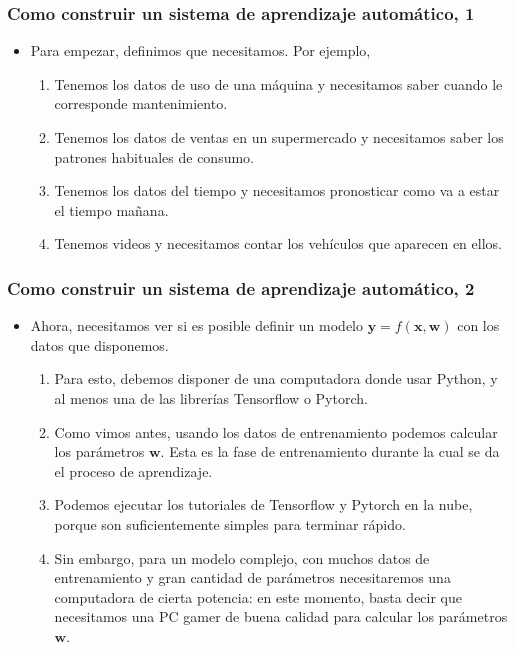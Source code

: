 \documentclass[11pt]{beamer}
\begin{document}
    \begin{frame}
    	\frametitle{Como construir un sistema de aprendizaje automático, 1}

        \begin{itemize}
        	\item Para empezar, definimos que necesitamos. Por ejemplo, 
        	\begin{enumerate}
        		\item Tenemos los datos de uso de una máquina y necesitamos saber cuando le corresponde mantenimiento.
        		\item Tenemos los datos de ventas en un supermercado y necesitamos saber los patrones habituales de consumo.
        		\item Tenemos los datos del tiempo y necesitamos pronosticar como va a estar el tiempo mañana.
        		\item Tenemos videos y necesitamos contar los vehículos que aparecen en ellos.
        	\end{enumerate}
    	\end{itemize}
    \end{frame}

    \begin{frame}
	\frametitle{Como construir un sistema de aprendizaje automático, 2}
	
	\begin{itemize}
		\item Ahora, necesitamos ver si es posible definir un modelo $\mathbf{y} = f(\mathbf{x}, \mathbf{w})$ con los datos que disponemos. 
		\begin{enumerate}
			\item Para esto, debemos disponer de una computadora donde usar Python, y al menos una de las librerías Tensorflow o Pytorch.
			\item Como vimos antes, usando los datos de entrenamiento podemos calcular los parámetros $\mathbf{w}$. Esta es la fase de entrenamiento durante la cual se da el proceso de aprendizaje.
            \item Podemos ejecutar los tutoriales de Tensorflow y Pytorch en la nube,
            porque son suficientemente simples para terminar rápido.
            \item Sin embargo, para un modelo complejo, con muchos datos de entrenamiento y gran cantidad de parámetros necesitaremos una computadora de cierta potencia: en este momento, basta decir que necesitamos una PC gamer de buena calidad para calcular los parámetros $\mathbf{w}$.
		\end{enumerate}
	\end{itemize}
    \end{frame}
\end{document}
